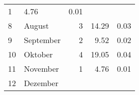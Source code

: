 \begin{longtable}{lXrrr}
       \num{1} &
       \num[round-mode=places,round-precision=2]{4,76} &
         \num[round-mode=places,round-precision=2]{0,01} \\

     8 &
     \multicolumn{1}{X}{ August   } &


       \num{3} &
       \num[round-mode=places,round-precision=2]{14,29} &
         \num[round-mode=places,round-precision=2]{0,03} \\

     9 &
     \multicolumn{1}{X}{ September   } &


       \num{2} &
       \num[round-mode=places,round-precision=2]{9,52} &
         \num[round-mode=places,round-precision=2]{0,02} \\

     10 &
     \multicolumn{1}{X}{ Oktober   } &


       \num{4} &
       \num[round-mode=places,round-precision=2]{19,05} &
         \num[round-mode=places,round-precision=2]{0,04} \\

     11 &
     \multicolumn{1}{X}{ November   } &


       \num{1} &
       \num[round-mode=places,round-precision=2]{4,76} &
         \num[round-mode=places,round-precision=2]{0,01} \\

     12 &
     \multicolumn{1}{X}{ Dezember   } &



\end{longtable}
